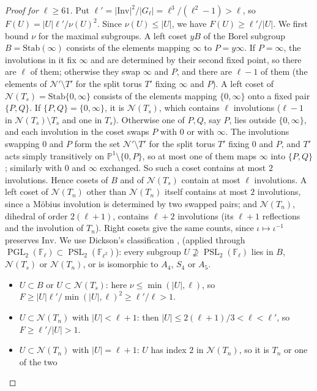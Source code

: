 \documentclass[11pt]{amsart}
\theoremstyle{definition}
\theoremstyle{remark}
\newcommand{\F}{\mathbb{F}}
\newcommand{\PP}{\mathbb{P}}
\DeclareMathOperator{\PGL}{PGL}
\DeclareMathOperator{\PSL}{PSL}
\newcommand{\Inv}{\mathrm{Inv}}
\newcommand{\Nor}{\mathcal{N}}     %
\begin{document}
\begin{proof}[Proof for $\ell\ge61$]
Put $\ell'=|\Inv|^2/|G_\ell|=\ell^3/(\ell^2-1)>\ell$, so $F(U)=|U|\ell'/\nu(U)^2$. Since $\nu(U)\le|U|$, we have
$F(U)\ge\ell'/|U|$. We first bound $\nu$ for the maximal subgroups. A left coset $yB$ of the Borel subgroup
$B=\mathrm{Stab}(\infty)$ consists of the elements mapping $\infty$ to $P=y\infty$. If $P=\infty$, the involutions in
it fix $\infty$ and are determined by their second fixed point, so there are $\ell$ of them; otherwise they swap
$\infty$ and $P$, and there are $\ell-1$ of them (the elements of $\Nor'\setminus T'$ for the split torus $T'$
fixing $\infty$ and $P$). A left coset of $\Nor(T_s)=\mathrm{Stab}\{0,\infty\}$ consists of the elements mapping
$\{0,\infty\}$ onto a fixed pair $\{P,Q\}$. If $\{P,Q\}=\{0,\infty\}$, it is $\Nor(T_s)$, which contains $\ell$
involutions ($\ell-1$ in $\Nor(T_s)\setminus T_s$ and one in $T_s$). Otherwise one of $P,Q$, say $P$, lies outside
$\{0,\infty\}$, and each involution in the coset swaps $P$ with $0$ or with $\infty$. The involutions swapping $0$ and
$P$ form the set $\Nor'\setminus T'$ for the split torus $T'$ fixing $0$ and $P$, and $T'$ acts simply transitively on
$\PP^1\setminus\{0,P\}$, so at most one of them maps $\infty$ into $\{P,Q\}$; similarly with $0$ and $\infty$
exchanged. So such a coset contains at most $2$ involutions. Hence cosets of $B$ and of $\Nor(T_s)$ contain at most
$\ell$ involutions. A left coset of $\Nor(T_n)$ other than $\Nor(T_n)$ itself contains at most $2$ involutions, since a
M\"obius involution is determined by two swapped pairs; and $\Nor(T_n)$, dihedral of order $2(\ell+1)$, contains
$\ell+2$ involutions (its $\ell+1$ reflections and the involution of $T_n$). Right cosets give the same counts, since
$\iota\mapsto\iota^{-1}$ preserves $\Inv$. We use Dickson's classification \cite[Part~II, Ch.~XII, \S260]{Dic01}, \cite[Kap.~II, Hauptsatz~8.27]{Hup67} (applied
through $\PGL_2(\F_\ell)\subset\PSL_2(\F_{\ell^2})$): every subgroup $U\not\supseteq\PSL_2(\F_\ell)$ lies in $B$,
$\Nor(T_s)$ or $\Nor(T_n)$, or is isomorphic to $A_4$, $S_4$ or $A_5$.
\begin{itemize}
\item $U\subset B$ or $U\subset\Nor(T_s)$: here $\nu\le\min(|U|,\ell)$, so $F\ge|U|\ell'/\min(|U|,\ell)^2\ge\ell'/\ell>1$.
\item $U\subset\Nor(T_n)$ with $|U|<\ell+1$: then $|U|\le2(\ell+1)/3<\ell<\ell'$, so $F\ge\ell'/|U|>1$.
\item $U\subset\Nor(T_n)$ with $|U|=\ell+1$: $U$ has index $2$ in $\Nor(T_n)$, so it is $T_n$ or one of the two

\end{itemize}
\end{proof}
\end{document}
